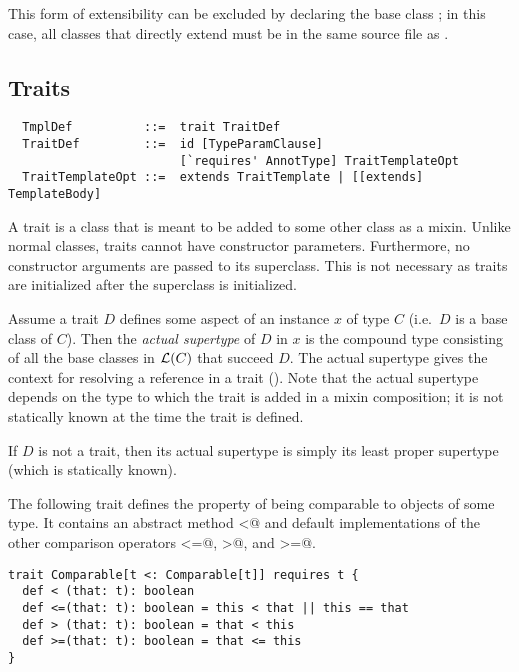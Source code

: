 This form of extensibility can be excluded by declaring the base class
 ; in this case, all classes that
directly extend  must be in the same source file as
.

\subsection{Traits}
\label{sec:traits}

\syntax\begin{lstlisting}
  TmplDef          ::=  trait TraitDef
  TraitDef         ::=  id [TypeParamClause]
                        [`requires' AnnotType] TraitTemplateOpt
  TraitTemplateOpt ::=  extends TraitTemplate | [[extends] TemplateBody]
\end{lstlisting}

A trait is a class that is meant to be added to some other class
as a mixin. Unlike normal classes, traits cannot have
constructor parameters. Furthermore, no constructor arguments are
passed to its superclass. This is not necessary as traits are
initialized after the superclass is initialized.

Assume a trait $D$ defines some aspect of an instance $x$ of
type $C$ (i.e.\ $D$ is a base class of $C$). Then the {\em actual
supertype} of $D$ in $x$ is the compound type consisting of all the
base classes in ${\cal L}(C)$ that succeed $D$.  The actual supertype gives
the context for resolving a  reference in a trait
(). Note that the actual supertype depends 
on the type to which the trait is added in a mixin composition; it is not
statically known at the time the trait is defined.

If $D$ is not a trait, then its actual supertype is simply its
least proper supertype (which is statically known).

\example\label{ex:comparable} The following trait defines the property
of being comparable to objects of some type. It contains an abstract
method \lstinline@<@ and default implementations of the other
comparison operators \lstinline@<=@, \lstinline@>@, and
\lstinline@>=@. 

\begin{lstlisting}
trait Comparable[t <: Comparable[t]] requires t { 
  def < (that: t): boolean
  def <=(that: t): boolean = this < that || this == that
  def > (that: t): boolean = that < this 
  def >=(that: t): boolean = that <= this
}
\end{lstlisting}

